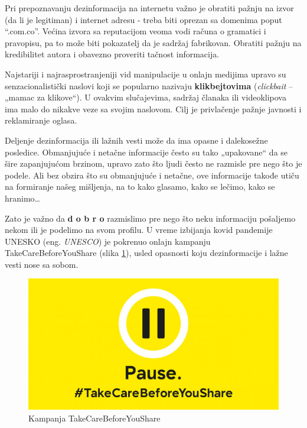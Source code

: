 \documentclass[a4paper]{article}
\begin{document}
\begin{itemize}
Pri prepoznavanju dezinformacija na internetu važno je obratiti pažnju na izvor (da li je legitiman) i internet adresu - treba biti oprezan sa domenima poput “.com.co”. Većina izvora sa reputacijom veoma vodi računa o gramatici i pravopisu, pa to može biti pokazatelj da je sadržaj fabrikovan. Obratiti pažnju na kredibilitet autora i obavezno proveriti tačnost informacija.


Najstariji i najrasprostranjeniji vid manipulacije u onlajn medijima upravo su 
senzacionalistički naslovi koji se popularno nazivaju \textbf{klikbejtovima} \cite{clickbait} (\emph{clickbait} – „mamac za klikove“). U ovakvim slučajevima, sadržaj članaka ili videoklipova ima malo do nikakve veze sa svojim naslovom. Cilj je privlačenje pažnje javnosti i reklamiranje oglasa. 


Deljenje dezinformacija ili lažnih vesti može da ima opasne i dalekosežne 
posledice. Obmanjujuće i netačne informacije često su tako „upakovane“ da se šire zapanjujućom brzinom, upravo zato što ljudi često ne razmisle pre nego što je podele. \newline
Ali bez obzira što su obmanjujuće i netačne, ove informacije takođe utiču na 
formiranje našeg mišljenja, na to kako glasamo, kako se lečimo, kako se hranimo… 



Zato je važno da \textbf{d o b r o} razmislimo pre nego što neku informaciju 
pošaljemo nekom ili je podelimo na svom profilu. 
U vreme izbijanja kovid pandemije UNESKO (eng. \emph{UNESCO}) je pokrenuo onlajn kampanju \newline
TakeCareBeforeYouShare \cite{unesco kampanja} (slika \ref{fig:takecarebeforeyoushare}), usled opasnosti koju dezinformacije i lažne vesti nose sa sobom. 

\begin{figure}[h!]
\begin{center}
\includegraphics[scale=0.4]{takecarebeforeyoushare.jpg}
\end{center}
\caption{Kampanja TakeCareBeforeYouShare}
\label{fig:takecarebeforeyoushare}
\end{figure}



\end{itemize}
\end{document}
